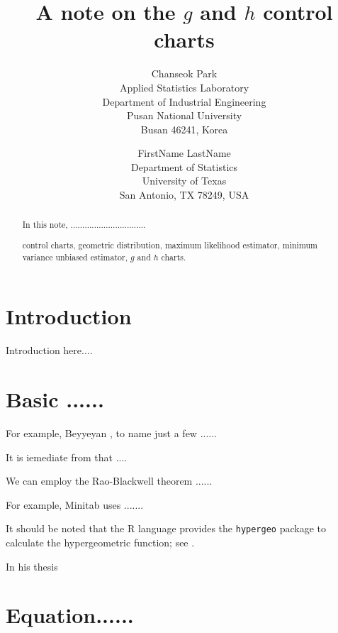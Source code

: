 \documentclass[11pt,a4paper]{article}
\title{\textbf{A note on the $g$ and $h$ control charts}}
\author{\textsf{Chanseok Park}\\
Applied Statistics Laboratory\\
Department of Industrial Engineering\\ Pusan National University\\
Busan 46241, Korea
\and
\textsf{FirstName LastName}\\
Department of Statistics \\
University of Texas \\
San Antonio, TX 78249, USA
}
\date{}
\begin{document}
\maketitle
\begin{abstract}
In this note,  ................................

 control charts, geometric distribution,
maximum likelihood estimator, minimum variance unbiased estimator, $g$ and $h$ charts.

\end{abstract}



\section{Introduction}
Introduction here....



\section{Basic ......} \label{SEC:basic}
For example, Beyyeyan \cite{Benneyan:1999,Benneyan:2000}, to name just a few ......

It is iemediate from \cite{Lehmann/Casella:1998} that .... 

We can employ the Rao-Blackwell theorem \citep{Rao:1945,Blackwell:1947} ......

For example, Minitab \cite{MinitabSupport20} uses .......

It should be noted that the R language provides the \texttt{hypergeo} package to calculate the hypergeometric function; 
see \cite{Hankin:2016}.

In his thesis~\citep{Gao:2020a}

\cite{Jeong/Son/Lee/Kim:2018}

\cite{Ouyang/Park/etc:2019}

\cite{Eun/etc:1989}


\section{Equation......} \label{SEC:Equation}
\end{document}
